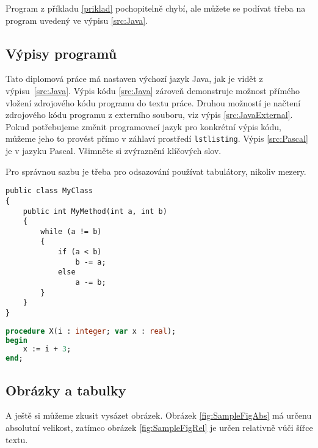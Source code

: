 \documentclass[bc,male,java,dept460]{diploma}		%
\begin{document}
\begin{remark}
Program z příkladu \ref{priklad} pochopitelně chybí,
ale můžete se podívat třeba na program uvedený ve výpisu \ref{src:Java}.
\end{remark}

\subsection{Výpisy programů}
Tato diplomová práce má nastaven výchozí jazyk Java, jak je vidět z výpisu~\ref{src:Java}. Výpis kódu \ref{src:Java} zároveň demonstruje možnost přímého vložení zdrojového kódu programu do textu práce. Druhou možností je načtení zdrojového kódu programu z externího souboru, viz výpis \ref{src:JavaExternal}. Pokud potřebujeme změnit programovací jazyk pro konkrétní výpis kódu, můžeme jeho to provést přímo v záhlaví prostředí \verb|lstlisting|. Výpis \ref{src:Pascal} je v jazyku Pascal. Všimněte si zvýraznění klíčových slov. 

\begin{remark}
Pro správnou sazbu je třeba pro odsazování používat tabulátory, nikoliv mezery.
\end{remark}


\begin{lstlisting}[label=src:Java,caption=Program v jazyce Java]
public class MyClass
{
	public int MyMethod(int a, int b)
	{
		while (a != b)
		{
			if (a < b)
				b -= a;
			else
				a -= b;
		}
	}
}
\end{lstlisting}



\begin{lstlisting}[language=Pascal,label=src:Pascal,caption=Program v Pascalu]
procedure X(i : integer; var x : real);
begin
	x := i + 3;
end;
\end{lstlisting}

\subsection{Obrázky a tabulky}
A ještě si můžeme zkusit vysázet obrázek. Obrázek \ref{fig:SampleFigAbs} má určenu absolutní velikost,
zatímco obrázek \ref{fig:SampleFigRel} je určen relativně vůči šířce textu.


\end{document}
